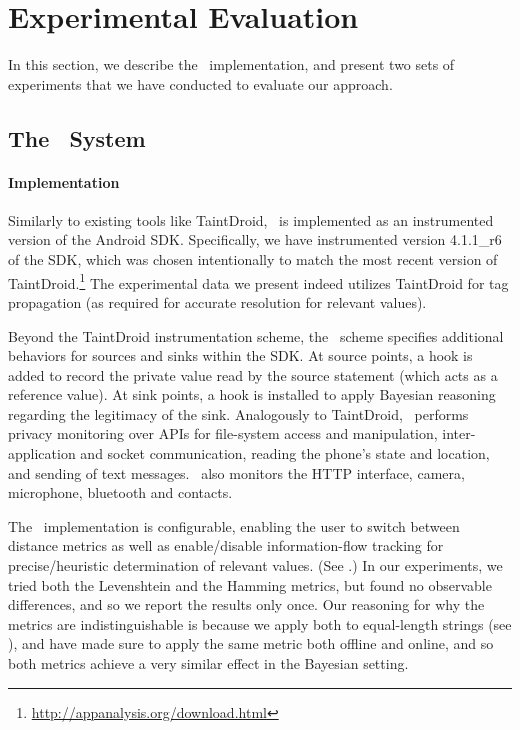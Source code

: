 \section{Experimental Evaluation}\label{Se:experiments}

In this section, we describe the \Tool\ implementation, and present two sets of experiments that we have conducted to evaluate our approach.

\subsection{The \Tool\ System}\label{Se:impl}

\paragraph{Implementation} Similarly to existing tools like TaintDroid, \Tool\ is implemented as an instrumented version of the Android SDK. Specifically, we have instrumented version 4.1.1\_r6 of the SDK, which was chosen intentionally to match the most recent version of TaintDroid.\footnote{
	\href{http://appanalysis.org/download.html}{http://appanalysis.org/download.html}
} The experimental data we present indeed utilizes TaintDroid for tag propagation (as required for accurate resolution for relevant values).

Beyond the TaintDroid instrumentation scheme, the \Tool\ scheme specifies additional behaviors for sources and sinks within the SDK. At source points, a hook is added to record the private value read by the source statement (which acts as a reference value). At sink points, a hook is installed to apply Bayesian reasoning regarding the legitimacy of the sink.
Analogously to TaintDroid, \Tool\ performs privacy monitoring over APIs for file-system access and manipulation, inter-application and socket communication, reading the phone's state and location, and sending of text messages. \Tool\ also monitors the HTTP interface, camera, microphone, bluetooth and contacts. 

The \Tool\ implementation is configurable, enabling the user to switch between distance metrics as well as enable/disable information-flow tracking for precise/heuristic determination of relevant values. (See .) In our experiments, we tried both the Levenshtein and the Hamming metrics, but found no observable differences, and so we report the results only once. Our reasoning for why the metrics are indistinguishable is because we apply both to equal-length strings (see ), and have made sure to apply the same metric both offline and online, and so both metrics achieve a very similar effect in the Bayesian setting.

